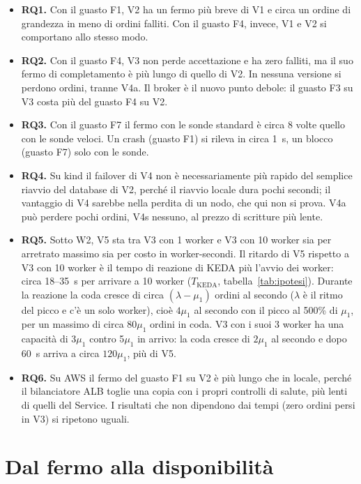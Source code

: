 \begin{itemize}
  \item \textbf{RQ1.} Con il guasto F1, V2 ha un fermo più breve di V1 e circa un ordine di grandezza in meno di ordini falliti. Con il guasto F4, invece, V1 e V2 si comportano allo stesso modo.
  \item \textbf{RQ2.} Con il guasto F4, V3 non perde accettazione e ha zero falliti, ma il suo fermo di completamento è più lungo di quello di V2. In nessuna versione si perdono ordini, tranne V4a. Il broker è il nuovo punto debole: il guasto F3 su V3 costa più del guasto F4 su V2.
  \item \textbf{RQ3.} Con il guasto F7 il fermo con le sonde standard è circa 8 volte quello con le sonde veloci. Un crash (guasto F1) si rileva in circa 1~s, un blocco (guasto F7) solo con le sonde.
  \item \textbf{RQ4.} Su kind il failover di V4 non è necessariamente più rapido del semplice riavvio del database di V2, perché il riavvio locale dura pochi secondi; il vantaggio di V4 sarebbe nella perdita di un nodo, che qui non si prova. V4a può perdere pochi ordini, V4s nessuno, al prezzo di scritture più lente.
  \item \textbf{RQ5.} Sotto W2, V5 sta tra V3 con 1 worker e V3 con 10 worker sia per arretrato massimo sia per costo in worker-secondi. Il ritardo di V5 rispetto a V3 con 10 worker è il tempo di reazione di KEDA più l'avvio dei worker: circa 18--35~s per arrivare a 10 worker ($T_{\text{KEDA}}$, tabella~\ref{tab:ipotesi}). Durante la reazione la coda cresce di circa $(\lambda - \mu_1)$ ordini al secondo ($\lambda$ è il ritmo del picco e c'è un solo worker), cioè $4\mu_1$ al secondo con il picco al 500\% di $\mu_1$, per un massimo di circa $80\mu_1$ ordini in coda. V3 con i suoi 3 worker ha una capacità di $3\mu_1$ contro 5$\mu_1$ in arrivo: la coda cresce di $2\mu_1$ al secondo e dopo 60~s arriva a circa $120\mu_1$, più di V5.
  \item \textbf{RQ6.} Su AWS il fermo del guasto F1 su V2 è più lungo che in locale, perché il bilanciatore ALB toglie una copia con i propri controlli di salute, più lenti di quelli del Service. I risultati che non dipendono dai tempi (zero ordini persi in V3) si ripetono uguali.
\end{itemize}

\section{Dal fermo alla disponibilità}
\label{sec:disponibilita}

